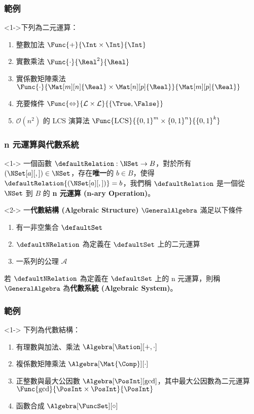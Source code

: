 \documentclass[utf8]{beamer}
\begin{document}
\begin{CJK}{UTF8}{bkai}
\begin{frame}
  \frametitle{範例}
  \begin{myexample}<1->下列為二元運算：
  \begin{enumerate}
  \item<2-> 整數加法 $\Func{+}{\Int\times{\Int}}{\Int}$
  \item<3-> 實數乘法 $\Func{\cdot}{\Real^2}{\Real}$
  \item<4-> 實係數矩陣乘法 $\Func{\cdot}{\Mat[m][n]{\Real}\times\Mat[n][p]{\Real}}{\Mat[m][p]{\Real}}$
  \item<5-> 充要條件 $\Func{\Leftrightarrow}{\mathcal{L}\times{\mathcal{L}}}{\left\{{\True,\False}\right\}}$
  \item<6-> $\mathcal{O}{(n^2)}$ 的 LCS 演算法 $\Func{\textsc{LCS}}{{{\{0,1\}}^{m}}\times{{\{0,1\}}^{n}}}{{\{0,1\}}^{k}}$
  \end{enumerate}
  \end{myexample}
\end{frame}

\begin{frame}
  \frametitle{n 元運算與代數系統}
  \begin{mydef}[n元運算]<1->
  \label{def:algebra:n_ary_operation}
  一個函數 $\defaultRelation: \NSet\rightarrow{B}$，對於所有 ${\left({\NSet[a][,]}\right)}\in{\NSet}$，存在\textbf{唯一}的 $b\in{B}$，使得 $\defaultRelation{\left({\NSet[a][,]}\right)}=b$，我們稱 $\defaultRelation$ 是一個從 $\NSet$ 到 $B$ 的\textbf{ n 元運算 (n-ary Operation)}。
  \end{mydef}
  \begin{mydef}[代數結構與代數系統]<2->
  \label{def:algebra:algebraic_structure}
  一\textbf{代數結構 (Algebraic Structure)} $\GeneralAlgebra$ 滿足以下條件
  \begin{enumerate}
  \item<3-> 有一非空集合 $\defaultSet$
  \item<4-> $\defaultNRelation$ 為定義在 $\defaultSet$ 上的二元運算
  \item<5-> 一系列的公理 $\mathcal{A}$
  \end{enumerate}
  若 $\defaultNRelation$ 為定義在 $\defaultSet$ 上的 n 元運算，則稱 $\GeneralAlgebra$ 為\textbf{代數系統 (Algebraic System)}。
  \end{mydef}
\end{frame}

\begin{frame}
  \frametitle{範例}
  \begin{myexample}<1->
  下列為代數結構：
  \begin{enumerate}
  \item<2-> 有理數與加法、乘法 $\Algebra[\Ration][+,\cdot]$
  \item<3-> 複係數矩陣乘法 $\Algebra[\Mat{\Comp}][\cdot]$
  \item<4-> 正整數與最大公因數 $\Algebra[\PosInt][\gcd]$，其中最大公因數為二元運算 $\Func{\gcd}{\PosInt\times{\PosInt}}{\PosInt}$
  \item<5-> 函數合成 $\Algebra[\FuncSet][\circ]$
  \end{enumerate}
  \end{myexample}
\end{frame}


\end{CJK}
\end{document}
